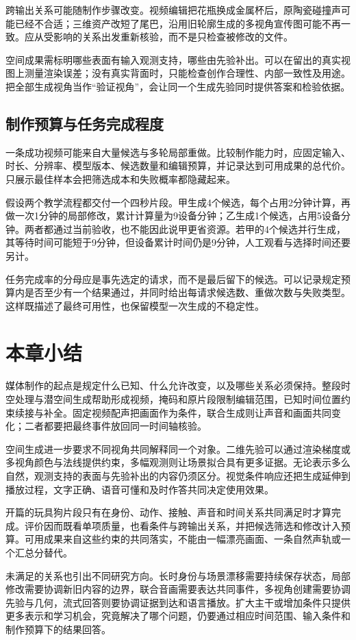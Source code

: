 跨输出关系可能随制作步骤改变。视频编辑把花瓶换成金属杯后，原陶瓷碰撞声可能已经不合适；三维资产改短了尾巴，沿用旧轮廓生成的多视角宣传图可能不再一致。应从受影响的关系出发重新核验，而不是只检查被修改的文件。

空间成果需标明哪些表面有输入观测支持，哪些由先验补出。可以在留出的真实视图上测量渲染误差；没有真实背面时，只能检查创作合理性、内部一致性及用途。把全部生成视角当作“验证视角”，会让同一个生成先验同时提供答案和检验依据。

\subsection{制作预算与任务完成程度}
\label{sec:vision-multigen-budget}

一条成功视频可能来自大量候选与多轮局部重做。比较制作能力时，应固定输入、时长、分辨率、模型版本、候选数量和编辑预算，并记录达到可用成果的总代价。只展示最佳样本会把筛选成本和失败概率都隐藏起来。

假设两个教学流程都交付一个四秒片段。甲生成4个候选，每个占用2分钟计算，再做一次1分钟的局部修改，累计计算量为9设备分钟；乙生成1个候选，占用5设备分钟。两者都通过当前验收，也不能因此说甲更省资源。若甲的4个候选并行生成，其等待时间可能短于9分钟，但设备累计时间仍是9分钟，人工观看与选择时间还要另计。

任务完成率的分母应是事先选定的请求，而不是最后留下的候选。可以记录规定预算内是否至少有一个结果通过，并同时给出每请求候选数、重做次数与失败类型。这样既描述了最终可用性，也保留模型一次生成的不稳定性。

\section{本章小结}
\label{sec:vision-multigen-summary}

媒体制作的起点是规定什么已知、什么允许改变，以及哪些关系必须保持。整段时空处理与潜空间生成帮助形成视频，掩码和原片段限制编辑范围，已知时间位置约束续接与补全。固定视频配声把画面作为条件，联合生成则让声音和画面共同变化；二者都要把最终事件放回同一时间轴核验。

空间生成进一步要求不同视角共同解释同一个对象。二维先验可以通过渲染梯度或多视角颜色与法线提供约束，多幅观测则让场景拟合具有更多证据。无论表示多么自然，观测支持的表面与先验补出的内容仍须区分。视觉条件响应还把生成延伸到播放过程，文字正确、语音可懂和及时作答共同决定使用效果。

开篇的玩具狗片段只有在身份、动作、接触、声音和时间关系共同满足时才算完成。评价因而既看单项质量，也看条件与跨输出关系，并把候选筛选和修改计入预算。可用成果来自这些约束的共同落实，不能由一幅漂亮画面、一条自然声轨或一个汇总分替代。

未满足的关系也引出不同研究方向。长时身份与场景漂移需要持续保存状态，局部修改需要协调新旧内容的边界，联合音画需要表达共同事件，多视角创建需要协调先验与几何，流式回答则要协调证据到达和语言播放。扩大主干或增加条件只提供更多表示和学习机会，究竟解决了哪个问题，仍要通过相应时间范围、输入条件和制作预算下的结果回答。
